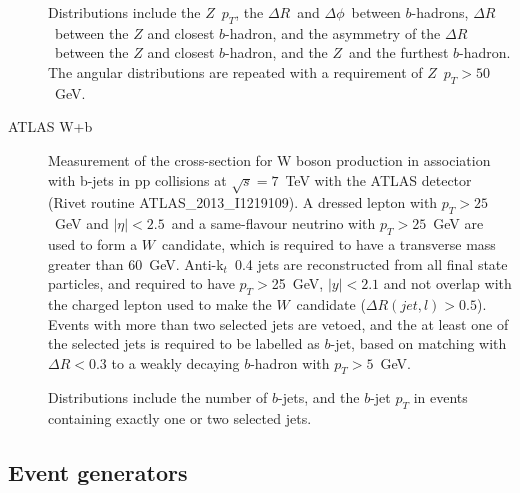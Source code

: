 \documentclass[11pt]{cernrep}
\newcommand{\pt}{\ensuremath{p_{T}}\xspace}
\begin{document}
\begin{description}
  Distributions include the $Z$\ \pt, the $\Delta R$\ and
  $\Delta\phi$\ between $b$-hadrons, $\Delta R$\ between the $Z$ and closest
  $b$-hadron, and the asymmetry of the $\Delta R$\ between the $Z$ and
  closest $b$-hadron, and the $Z$\ and the furthest $b$-hadron. The angular
  distributions are repeated with a requirement of $Z$\ $\pt>50$~GeV.

\item[ATLAS W+b] Measurement of the cross-section for W boson production in association
  with b-jets in pp collisions at $\sqrt{s} = 7$~TeV with the ATLAS
  detector~\cite{Aad:2013vka} (Rivet routine ATLAS\_2013\_I1219109). A
  dressed lepton with $\pt>25$~GeV and $|\eta|<2.5$\ and a same-flavour
  neutrino with $\pt>25$~GeV are used to form a $W$~candidate, which is
  required to have a transverse mass greater than $60$~GeV. Anti-k$_{t}$\ 0.4
  jets are reconstructed from all final state particles, and required to have
  $\pt>$25~GeV, $|y|<2.1$ and not overlap with the charged lepton used to
  make the $W$~candidate ($\Delta R(jet, l)> 0.5$). Events with more than two
  selected jets are vetoed, and the at least one of the selected jets is
  required to be labelled as $b$-jet, based on matching with $\Delta R<0.3$
  to a weakly decaying $b$-hadron with $\pt>5$~GeV.

  Distributions include the number of $b$-jets, and the $b$-jet \pt in events
  containing exactly one or two selected jets.


\end{description}

\subsection{Event generators \label{generators}}
\end{document}
